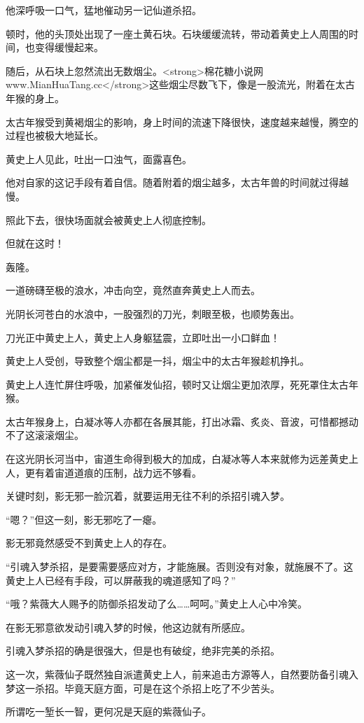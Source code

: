 \begin{this_body}
他深呼吸一口气，猛地催动另一记仙道杀招。

顿时，他的头顶处出现了一座土黄石块。石块缓缓流转，带动着黄史上人周围的时间，也变得缓慢起来。

随后，从石块上忽然流出无数烟尘。<strong>棉花糖小说网www.MianHuaTang.cc</strong>这些烟尘尽数飞下，像是一股流光，附着在太古年猴的身上。

太古年猴受到黄褐烟尘的影响，身上时间的流速下降很快，速度越来越慢，腾空的过程也被极大地延长。

黄史上人见此，吐出一口浊气，面露喜色。

他对自家的这记手段有着自信。随着附着的烟尘越多，太古年兽的时间就过得越慢。

照此下去，很快场面就会被黄史上人彻底控制。

但就在这时！

轰隆。

一道磅礴至极的浪水，冲击向空，竟然直奔黄史上人而去。

光阴长河苍白的水浪中，一股强烈的刀光，刺眼至极，也顺势轰出。

刀光正中黄史上人，黄史上人身躯猛震，立即吐出一小口鲜血！

黄史上人受创，导致整个烟尘都是一抖，烟尘中的太古年猴趁机挣扎。

黄史上人连忙屏住呼吸，加紧催发仙招，顿时又让烟尘更加浓厚，死死罩住太古年猴。

太古年猴身上，白凝冰等人亦都在各展其能，打出冰霜、炙炎、音波，可惜都撼动不了这滚滚烟尘。

在这光阴长河当中，宙道生命得到极大的加成，白凝冰等人本来就修为远差黄史上人，更有着宙道道痕的压制，战力远不够看。

关键时刻，影无邪一脸沉着，就要运用无往不利的杀招引魂入梦。

“嗯？”但这一刻，影无邪吃了一瘪。

影无邪竟然感受不到黄史上人的存在。

“引魂入梦杀招，是要需要感应对方，才能施展。否则没有对象，就施展不了。这黄史上人已经有手段，可以屏蔽我的魂道感知了吗？”

“哦？紫薇大人赐予的防御杀招发动了么……呵呵。”黄史上人心中冷笑。

在影无邪意欲发动引魂入梦的时候，他这边就有所感应。

引魂入梦杀招的确是很强大，但是也有破绽，绝非完美的杀招。

这一次，紫薇仙子既然独自派遣黄史上人，前来追击方源等人，自然要防备引魂入梦这一杀招。毕竟天庭方面，可是在这个杀招上吃了不少苦头。

所谓吃一堑长一智，更何况是天庭的紫薇仙子。


\end{this_body}
